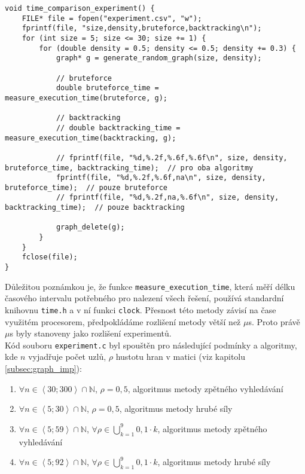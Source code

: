 \documentclass[a4paper]{article}
\begin{document}
    \begin{lstlisting}[caption={Zjednodušený kód hlavní funkce souboru \lstinline{experiment.c} nasteven pro generaci grafů velikosti 5 až 30 s hustotou 0,5 pro algoritmus metody hrubé síly.}, captionpos=b, label={code:experiment}]
void time_comparison_experiment() {
    FILE* file = fopen("experiment.csv", "w");
    fprintf(file, "size,density,bruteforce,backtracking\n");
    for (int size = 5; size <= 30; size += 1) { 
        for (double density = 0.5; density <= 0.5; density += 0.3) {
            graph* g = generate_random_graph(size, density);

            // bruteforce
            double bruteforce_time = measure_execution_time(bruteforce, g);

            // backtracking
            // double backtracking_time = measure_execution_time(backtracking, g);

            // fprintf(file, "%d,%.2f,%.6f,%.6f\n", size, density, bruteforce_time, backtracking_time);  // pro oba algoritmy
            fprintf(file, "%d,%.2f,%.6f,na\n", size, density, bruteforce_time);  // pouze bruteforce
            // fprintf(file, "%d,%.2f,na,%.6f\n", size, density, backtracking_time);  // pouze backtracking

            graph_delete(g);
        }
    }
    fclose(file);
}
    \end{lstlisting}

    \noindent
    Důležitou poznámkou je, že funkce \lstinline{measure_execution_time}, která měří délku časového intervalu potřebného pro nalezení všech řešení, používá standardní knihovnu \lstinline{time.h} a v ní funkci \lstinline{clock}. Přesnost této metody závisí na čase využitém procesorem, předpokládáme rozlišení metody větší než $\mu$s. Proto právě $\mu$s byly stanoveny jako rozlišení experimentů.\\

    \noindent
    Kód souboru \lstinline{experiment.c} byl spouštěn pro následující podmínky a algoritmy, kde $n$ vyjadřuje počet uzlů, $\rho$ hustotu hran v matici (viz kapitolu \ref{subsec:graph_imp}):
    \begin{enumerate}
        \item $\forall n \in \left<30;300\right> \cap \mathbb{N}$, $\rho = 0,5$, algoritmus metody zpětného vyhledávání
        \item $\forall n \in \left<5;30\right> \cap \mathbb{N}$, $\rho = 0,5$, algoritmus metody hrubé síly
        \item $\forall n \in \left<5;59\right> \cap \mathbb{N}$, $\forall \rho \in \bigcup_{k=1}^{9}0,1\cdot k$, algoritmus metody zpětného vyhledávání
        \item $\forall n \in \left<5;92\right> \cap \mathbb{N}$, $\forall \rho \in \bigcup_{k=1}^{9}0,1\cdot k$, algoritmus metody hrubé síly
    \end{enumerate}
\end{document}
